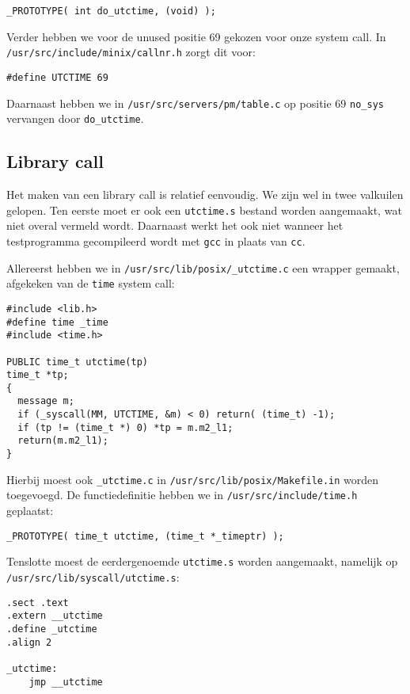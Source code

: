\documentclass[11pt]{article}
\begin{document}
\begin{verbatim}
_PROTOTYPE( int do_utctime, (void) );
\end{verbatim}

Verder hebben we voor de unused positie 69 gekozen voor onze system call. In \verb+/usr/src/include/minix/callnr.h+
zorgt dit voor:

\begin{verbatim}
#define UTCTIME 69
\end{verbatim}

Daarnaast hebben we in \verb+/usr/src/servers/pm/table.c+ op positie 69 \verb+no_sys+ vervangen
door \verb+do_utctime+.

\subsection*{Library call}

Het maken van een library call is relatief eenvoudig. We zijn wel in twee valkuilen gelopen. Ten eerste
moet er ook een \verb+utctime.s+ bestand worden aangemaakt, wat niet overal vermeld wordt. Daarnaast
werkt het ook niet wanneer het testprogramma gecompileerd wordt met \verb+gcc+ in plaats van \verb+cc+.

Allereerst hebben we in \verb+/usr/src/lib/posix/_utctime.c+ een wrapper gemaakt, afgekeken van de
\verb+time+ system call:

\begin{verbatim}
#include <lib.h>
#define time _time
#include <time.h>

PUBLIC time_t utctime(tp)
time_t *tp;
{
  message m;
  if (_syscall(MM, UTCTIME, &m) < 0) return( (time_t) -1);
  if (tp != (time_t *) 0) *tp = m.m2_l1;
  return(m.m2_l1);
}
\end{verbatim}

Hierbij moest ook \verb+_utctime.c+ in \verb+/usr/src/lib/posix/Makefile.in+ worden toegevoegd.
De functiedefinitie hebben we in \verb+/usr/src/include/time.h+ geplaatst:

\begin{verbatim}
_PROTOTYPE( time_t utctime, (time_t *_timeptr) );
\end{verbatim}

Tenslotte moest de eerdergenoemde \verb+utctime.s+ worden aangemaakt, namelijk op
\verb+/usr/src/lib/syscall/utctime.s+:

\begin{verbatim}
.sect .text
.extern __utctime
.define _utctime
.align 2

_utctime:
	jmp __utctime
\end{verbatim}
\end{document}
